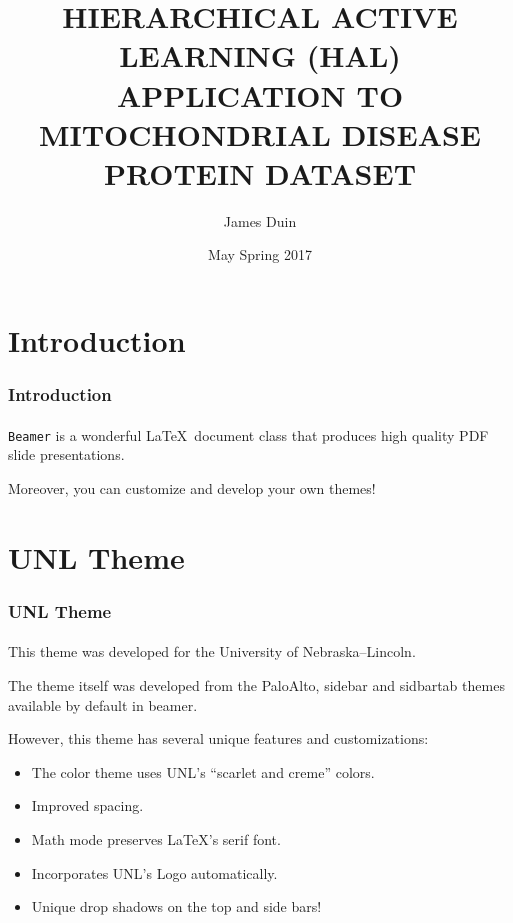 \documentclass{beamer}
\title[HAL - Protein]{HIERARCHICAL ACTIVE LEARNING (HAL) APPLICATION TO MITOCHONDRIAL DISEASE PROTEIN DATASET}
\author{James Duin} %
\institute{University Of Nebraska -- Lincoln}
\date{May Spring 2017}
\begin{document}
\begin{frame}
        \titlepage
        \begin{center}
    \href{mailto:jamesdduin@gmail.com}{}
        \end{center}
\end{frame}



\section{Introduction}

\begin{frame}
    \frametitle{Introduction}
    \framesubtitle{}

    \texttt{Beamer} is a wonderful \LaTeX\ document class that produces
    high quality PDF slide presentations.
    
    Moreover, you can customize and develop your own themes!

\end{frame}

\section{UNL Theme}    

\begin{frame}
    \frametitle{UNL Theme}
    \framesubtitle{}

    This theme was developed for the University of Nebraska--Lincoln.
    
    The theme itself was developed from the PaloAlto, sidebar and sidbartab
    themes available by default in beamer.
    
    However, this theme has several unique features and customizations:
    \begin{itemize}
      \item The color theme uses UNL's ``scarlet and creme'' colors.
      \item Improved spacing.
      \item Math mode preserves \LaTeX's serif font.
      \item Incorporates UNL's Logo automatically.
      \item Unique drop shadows on the top and side bars!
    \end{itemize}

\end{frame}
\end{document}
